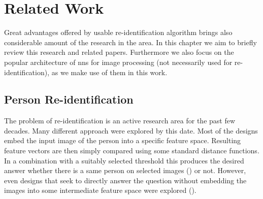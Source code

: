 \chapter{Related Work}



Great advantages offered by usable re-identification algorithm brings also
considerable amount of the research in the area. In this chapter we aim to
briefly review this research and related papers. Furthermore we also focus on
the popular architecture of \glspl{nn} for image processing (not necessarily
used for re-identification), as we make use of them in this work.


\section{Person Re-identification}




The problem of re-identification is an active research area for the past
few decades. Many different approach were explored by this date. Most
of the designs embed the input image of the person into a specific
feature space. Resulting feature vectors are then simply compared using
some standard distance functions. In a combination with a suitably selected
threshold this produces the desired answer whether there is a same person
on selected images (\cite{cheng2016person}) or not. However, even designs that seek to
directly answer the question without embedding the images into some intermediate feature
space were explored (\cite{li2014deepreid}).

